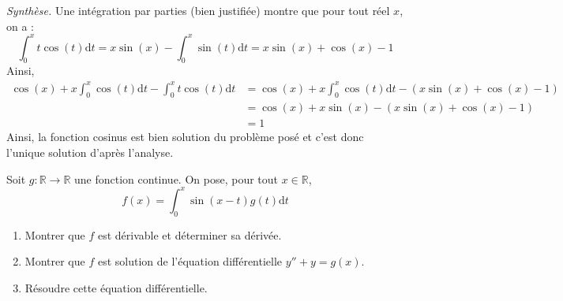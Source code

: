 \documentclass[a4paper,twoside,french,11pt]{VcCours}
\newcommand{\dt}{\text{d}t}
\begin{document}
\noindent \textit{Synthèse.} Une intégration par parties (bien justifiée) montre que pour tout réel $x$, on a :
$$ \int_0^x t \cos(t) \dt = x \sin(x) - \int_0^x \sin(t) \dt = x \sin(x) + \cos(x) - 1 $$
Ainsi,
\begin{align*}
\cos(x) + x \int_0^x \cos(t) \dt - \int_0^x t \cos(t) \dt & =  \cos(x) + x \int_0^x \cos(t) \dt  - (x \sin(x) + \cos(x) - 1) \\
& = \cos(x) + x \sin(x)  - (x \sin(x) + \cos(x) - 1) \\
& = 1 
\end{align*}
Ainsi, la fonction cosinus est bien solution du problème posé et c'est donc l'unique solution d'après l'analyse.

\begin{Exercice}{} Soit $g : \mathbb{R} \rightarrow \mathbb{R}$ une fonction continue. On pose, pour tout $x \in \mathbb{R}$,
    \[
    f(x) = \int_0^x {\sin(x - t)g(t) \dt}
    \]
    \begin{enumerate}
      \item Montrer que $f$ est dérivable et déterminer sa dérivée.
      \item Montrer que $f$ est solution de l'équation différentielle $y'' + y = g(x)$.
      \item Résoudre cette équation différentielle.
    \end{enumerate}
\end{Exercice}
\end{document}
